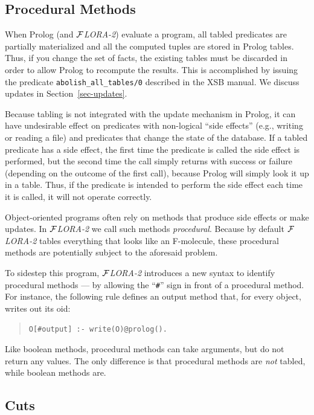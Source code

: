 \documentclass[11pt]{article}
\newcommand{\FLORA}{{\mbox{${\cal F}${\small\it LORA}\rm\emph{-2}}}\xspace}
\begin{document}
\subsection{Procedural Methods}\label{sec-proc-methods}

When Prolog (and \FLORA) evaluate a program, all tabled predicates are
partially materialized and all the computed tuples are stored in Prolog
tables. Thus, if you change the set of facts, the existing tables must be
discarded in order to allow Prolog to recompute the results. This is
accomplished by issuing the predicate {\tt abolish\_all\_tables/0}
described in the XSB manual. We discuss updates in
Section~\ref{sec-updates}.

%
Because tabling is not integrated with the update mechanism in Prolog, it can
have undesirable effect on predicates with non-logical ``side effects''
(e.g., writing or reading a file) and predicates that change the state of
the database.  If a tabled predicate has a side effect, the first time the
predicate is called the side effect is performed, but the second time the
call simply returns with success or failure (depending on the outcome of
the first call), because Prolog will simply look it up in a table.  Thus, if
the predicate is intended to perform the side effect each time it is
called, it will not operate correctly.

Object-oriented programs often rely on methods that produce side effects
or make updates.  In \FLORA we call such methods \emph{procedural}.
Because by default \FLORA tables everything that looks like an F-molecule,
these procedural methods are potentially subject to the aforesaid problem.

To sidestep this program, \FLORA introduces a new syntax to identify
procedural methods --- by allowing the ``\verb|#|'' sign in front of a
procedural method. For instance, the following rule defines an output
method that, for every object, writes out its oid:
\begin{quote}
\verb|O[#output] :- write(O)@prolog().|
\end{quote}
Like boolean methods, procedural methods can take arguments, but do not
return any values.  The only difference is that procedural methods are
\emph{not} tabled, while boolean methods are.


\subsection{Cuts}
\end{document}
